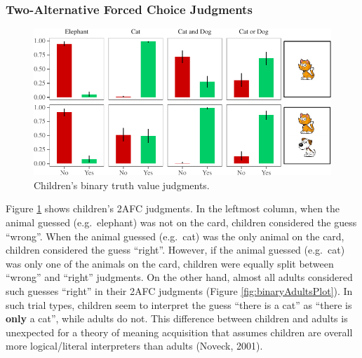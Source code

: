 \documentclass[oneside]{report}
\theoremstyle{definition}
\theoremstyle{definition}
\theoremstyle{definition}
\theoremstyle{remark}
\begin{document}
\subsubsection{Two-Alternative Forced Choice
Judgments}\label{two-alternative-forced-choice-judgments}
\begin{figure}[t]

{\centering \includegraphics{figs/Study3tvjtPlot-1} 

}

\caption{Children's binary truth value judgments.}\label{fig:Study3tvjtPlot}
\end{figure}
Figure \ref{fig:Study3tvjtPlot} shows children's 2AFC judgments. In the
leftmost column, when the animal guessed (e.g.~elephant) was not on the
card, children considered the guess ``wrong''. When the animal guessed
(e.g.~cat) was the only animal on the card, children considered the
guess ``right''. However, if the animal guessed (e.g.~cat) was only one
of the animals on the card, children were equally split between
``wrong'' and ``right'' judgments. On the other hand, almost all adults
considered such guesses ``right'' in their 2AFC judgments (Figure
\ref{fig:binaryAdultsPlot}). In such trial types, children seem to
interpret the guess ``there is a cat'' as ``there is \textbf{only} a
cat'', while adults do not. This difference between children and adults
is unexpected for a theory of meaning acquisition that assumes children
are overall more logical/literal interpreters than adults (Noveck,
2001).
\end{document}
